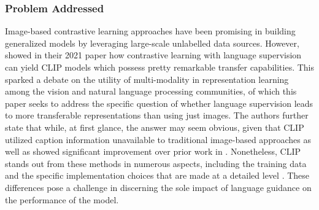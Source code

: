 \documentclass[11pt]{article}
\begin{document}
\subsubsection{Problem Addressed}
Image-based contrastive learning approaches have been promising in building generalized models by leveraging large-scale unlabelled data sources. However, \citep{radford2021learning} showed in their 2021 paper how contrastive learning with language supervision can yield CLIP models which possess pretty remarkable transfer capabilities. This sparked a debate on the utility of multi-modality in representation learning among the vision and natural language processing communities, of which this paper seeks to address the specific question of whether language supervision leads to more transferable representations than using just images. The authors further state that while, at first glance, the answer may seem obvious, given that CLIP utilized caption information unavailable to traditional image-based approaches as well as showed significant improvement over prior work in \cite{radford2021learning}. Nonetheless, CLIP stands out from these methods in numerous aspects, including the training data and the specific implementation choices that are made at a detailed level \cite{devillers-etal-2021-language}. These differences pose a challenge in discerning the sole impact of language guidance on the performance of the model.
\end{document}
